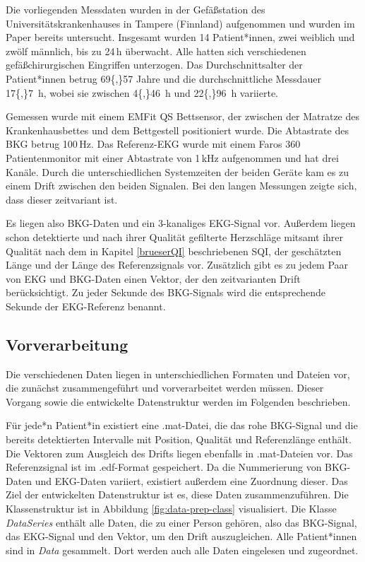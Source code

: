 	Die vorliegenden Messdaten wurden in der Gefäßstation des Universitätskrankenhauses in Tampere (Finnland) aufgenommen und wurden im Paper  bereits untersucht. Insgesamt wurden 14 Patient*innen, zwei weiblich und zwölf männlich, bis zu 24\,h überwacht. Alle hatten sich verschiedenen gefäßchirurgischen Eingriffen unterzogen. Das Durchschnittsalter der Patient*innen betrug \num{69{,}57} Jahre und die durchschnittliche Messdauer \SI{17{,}7}{\hour}, wobei sie zwischen \SI{4{,}46}{\hour} und \SI{22{,}96}{\hour} variierte.
	
	Gemessen wurde mit einem EMFit QS Bettsensor, der zwischen der Matratze des Krankenhausbettes und dem Bettgestell positioniert wurde. Die Abtastrate des \ac{BKG} betrug 100\,Hz. Das Referenz-\ac{EKG} wurde mit einem Faros 360 Patientenmonitor mit einer Abtastrate von 1\,kHz aufgenommen und hat drei Kanäle. Durch die unterschiedlichen Systemzeiten der beiden Geräte kam es zu einem Drift zwischen den beiden Signalen. Bei den langen Messungen zeigte sich, dass dieser zeitvariant ist.
	
	Es liegen also \ac{BKG}-Daten und ein 3-kanaliges \ac{EKG}-Signal vor. Außerdem liegen schon detektierte und nach ihrer Qualität gefilterte Herzschläge mitsamt ihrer Qualität nach dem in Kapitel \ref{brueserQI} beschriebenen \ac{SQI}, der geschätzten Länge und der Länge des Referenzsignals vor. Zusätzlich gibt es zu jedem Paar von \ac{EKG} und \ac{BKG}-Daten einen Vektor, der den zeitvarianten Drift berücksichtigt. Zu jeder Sekunde des \ac{BKG}-Signals wird die entsprechende Sekunde der \ac{EKG}-Referenz benannt.
	
	\subsection{Vorverarbeitung}
	
	Die verschiedenen Daten liegen in unterschiedlichen Formaten und Dateien vor, die zunächst zusammengeführt und vorverarbeitet werden müssen. Dieser Vorgang sowie die entwickelte Datenstruktur werden im Folgenden beschrieben.
	
	Für jede*n Patient*in existiert eine .mat-Datei, die das rohe \ac{BKG}-Signal und die bereits detektierten Intervalle mit Position, Qualität und Referenzlänge enthält. Die Vektoren zum Ausgleich des Drifts liegen ebenfalls in .mat-Dateien vor. Das Referenzsignal ist im .edf-Format gespeichert. Da die Nummerierung von \ac{BKG}-Daten und \ac{EKG}-Daten variiert, existiert außerdem eine Zuordnung dieser. Das Ziel der entwickelten Datenstruktur ist es, diese Daten zusammenzuführen. Die Klassenstruktur ist in Abbildung \ref{fig:data-prep-class} visualisiert. Die Klasse \textit{DataSeries} enthält alle Daten, die zu einer Person gehören, also das \ac{BKG}-Signal, das \ac{EKG}-Signal und den Vektor, um den Drift auszugleichen. Alle Patient*innen sind in \textit{Data} gesammelt. Dort werden auch alle Daten eingelesen und zugeordnet.
	
